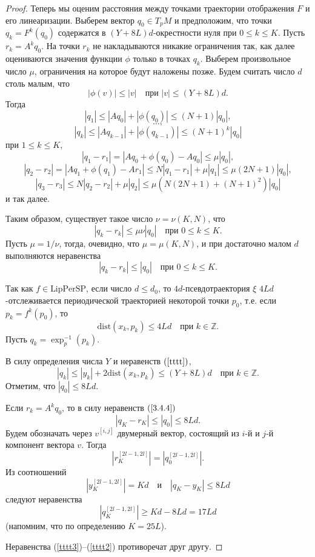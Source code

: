 \documentclass[12pt]{article}
\begin{document}
\begin{proof}
 Теперь мы оценим расстояния между точками траектории отоб\-ражения $F$ и его линеаризации.
Выберем вектор $q_0\in T_pM$ и предположим, что точки $q_k=F^k(q_0)$ содержатся в $(Y+8L)d$-окрест\-нос\-ти нуля при $0\leq k\leq K$. Пусть $r_k=A^kq_0$. На точки $r_k$ не нак\-ладываются никакие ограничения так, как далее оцениваются значения функции $\phi$ только в точках $q_k$. Выберем произвольное число $\mu$, ограничения на которое будут наложены позже. Будем считать число $d$ столь малым, что
$$|\phi(v)|\leq|v|\quad\mbox{при }|v|\leq (Y+8L)d.$$
Тогда 
$$|q_1|\leq |Aq_0|+|\phi(q_0)|\leq (N+1)|q_0|,$$
$$\ldots,$$
$$|q_k|\leq |Aq_{k-1}|+|\phi(q_{k-1})|\leq (N+1)^k|q_0|$$
при $1\leq k\leq K$,
$$|q_1-r_1|=|Aq_0+\phi(q_0)-Aq_0|\leq\mu|q_0|,$$
$$|q_2-r_2|=|Aq_1+\phi(q_1)-Ar_1|\leq N|q_1-r_1|+\mu|q_1|\leq\mu(2N+1)|q_0|,$$
$$|q_3-r_3|\leq N|q_2-r_2|+\mu|q_2|\leq \mu(N(2N+1)+(N+1)^2)|q_0|$$
и так далее.

Таким образом, существует такое число $\nu=\nu(K,N)$, что
$$|q_k-r_k|\leq\mu\nu|q_0|\quad\mbox{при }0\leq k\leq K.$$
Пусть $\mu=1/\nu$, тогда, очевидно, что $\mu=\mu(K,N)$, и при достаточно малом $d$ выполняются неравенства  
\begin{equation} 
\label{3.4.4} 
|q_k-r_k|\leq|q_0|\quad\mbox{при }0\leq k\leq K.	 
\end{equation} 

Так как $f\in\mbox{LipPerSP}$, если число $d\leq d_0$, то $4d$-псевдо\-тра\-ек\-то\-рия $\xi$ $4Ld$-отслеживается периодической траекторией некоторой точки $p_0$, т.е. если $p_k=f^k(p_0)$, то
\begin{equation}
\label{tttt}
\mbox{dist}(x_k,p_k)\leq 4Ld\quad\textrm{при }k\in\mathbb{Z}.
\end{equation}
Пусть $q_k=\exp^{-1}_p(p_k)$. 

В силу определения числа $Y$ и неравенств $(\ref{tttt})$, 
$$|q_k|\leq |y_k| + 2\mbox{dist}(x_k,p_k)\leq (Y+8L)d\quad\textrm{при }k\in\mathbb{Z}.$$
Отметим, что $|q_0|\leq 8Ld$. 
 
Если $r_k=A^kq_0$, то в силу неравенств $(\ref{3.4.4})$ 
\begin{equation}
\label{tttt3}
|q_K-r_K|\leq |q_0|\leq 8Ld.
\end{equation}
Будем обозначать через $v^{[i,j]}$ двумерный вектор, состоящий из $i$-й и $j$-й компонент вектора $v$. Тогда 
\begin{equation}
\label{tttt4}
|r_K^{[2l-1,2l]}|=|q_0^{[2l-1,2l]}|.
\end{equation}
Из соотношений
$$|y^{[2l-1,2l]}_K|=Kd\quad\textrm{и}\quad |q_K-y_K|\leq 8Ld$$
следуют неравенства
\begin{equation}
\label{tttt2}
|q_K^{[2l-1,2l]}|\geq Kd -8Ld = 17Ld
\end{equation}
(напомним, что по определению $K=25L$).

Неравенства (\ref{tttt3})--(\ref{tttt2}) противоречат друг другу.
\end{proof}
\end{document}

